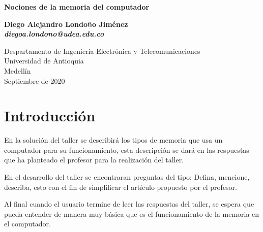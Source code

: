 \documentclass[12pt,letterpaper]{article}
\begin{document}

\begin{titlepage}
    \begin{center}
        \vspace*{1cm}
            
        \Huge
        \textbf{Nociones de la memoria del computador \textcolor{red}{\Biohazard}}
            
        \vspace{0.5cm}
        \LARGE
            
        \vspace{1.5cm}
            
        \textbf{Diego Alejandro Londoño Jiménez\\ \emph{diegoa.londono@udea.edu.co} }
            
        \vfill
            
        \vspace{0.8cm}
            
        \Large
        Despartamento de Ingeniería Electrónica y Telecomunicaciones\\
        Universidad de Antioquia\\
        Medellín\\
        Septiembre de 2020\\
        
            
    \end{center}
\end{titlepage}



\tableofcontents
\listoffigures


\newpage

\section{Introducción}

En la solución del taller se describirá los tipos de memoria que usa un computador para su funcionamiento, esta descripción se dará en las respuestas que ha planteado el profesor para la realización del taller.

En el desarrollo del taller se encontraran preguntas del tipo: Defina, mencione, describa, esto con el fin de simplificar el artículo propuesto por el profesor.

Al final cuando el usuario termine de leer las respuestas del taller, se espera que pueda entender de manera muy básica que es el funcionamiento de la memoria en el computador.
\end{document}
